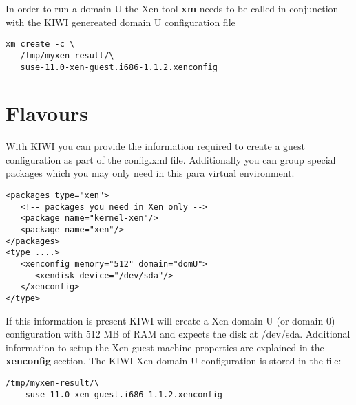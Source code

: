 In order to run a domain U the Xen tool \textbf{xm} needs to be called
in conjunction with the KIWI genereated domain U configuration file

\begin{Command}{13cm}
\begin{verbatim}
xm create -c \
   /tmp/myxen-result/\
   suse-11.0-xen-guest.i686-1.1.2.xenconfig
\end{verbatim}
\end{Command}

\section{Flavours}

With KIWI you can provide the information
required to create a guest configuration as part of the config.xml
file. Additionally you can group special packages which you may only
need in this para virtual environment.

\begin{Command}{13cm}
\begin{verbatim}
<packages type="xen">
   <!-- packages you need in Xen only -->
   <package name="kernel-xen"/>
   <package name="xen"/>
</packages>
<type ....>
   <xenconfig memory="512" domain="domU">
      <xendisk device="/dev/sda"/>
   </xenconfig>
</type>
\end{verbatim}
\end{Command}

If this information is present KIWI will create a Xen domain U
(or domain 0)
configuration with 512 MB of RAM and expects the disk at /dev/sda.
Additional information to setup the Xen guest machine properties are
explained in the \textbf{xenconfig} section. The KIWI Xen domain U
configuration is stored in the file:

\begin{Command}{13cm}
\begin{verbatim}
/tmp/myxen-result/\
    suse-11.0-xen-guest.i686-1.1.2.xenconfig
\end{verbatim}
\end{Command}
